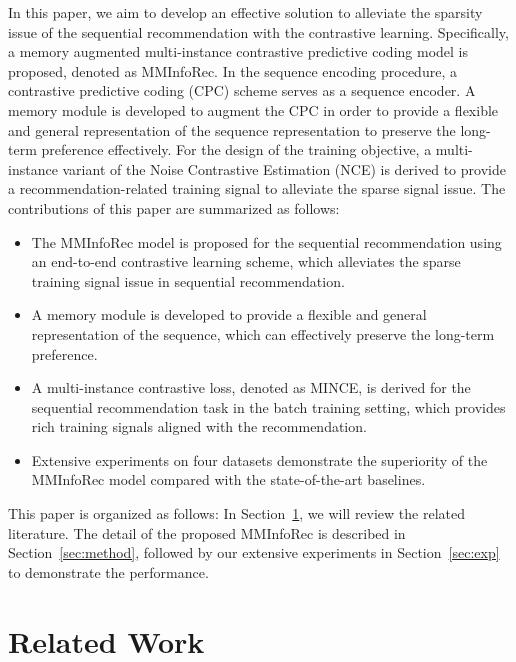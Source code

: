 \documentclass[conference]{IEEEtran}
\begin{document}
In this paper, we aim to develop an effective solution to alleviate the sparsity issue of the sequential recommendation with the contrastive learning. Specifically, a memory augmented multi-instance contrastive predictive coding model is proposed, denoted as MMInfoRec. In the sequence encoding procedure, a contrastive predictive coding (CPC) scheme serves as a sequence encoder. A memory module is developed to augment the CPC in order to provide a flexible and general representation of the sequence representation to preserve the long-term preference effectively. For the design of the training objective, a multi-instance variant of the Noise Contrastive Estimation (NCE) is derived to provide a recommendation-related training signal to alleviate the sparse signal issue. The contributions of this paper are summarized as follows:
\begin{itemize}
    \item The MMInfoRec model is proposed for the sequential recommendation using an end-to-end contrastive learning scheme, which alleviates the sparse training signal issue in sequential recommendation.
    \item A memory module is developed to provide a flexible and general representation of the sequence, which can effectively preserve the long-term preference.
    \item A multi-instance contrastive loss, denoted as MINCE, is derived for the sequential recommendation task in the batch training setting, which provides rich training signals aligned with the recommendation.
    \item Extensive experiments on four datasets demonstrate the superiority of the MMInfoRec model compared with the state-of-the-art baselines.
\end{itemize}

This paper is organized as follows: In Section~\ref{sec:rw}, we will review the related literature. 
The detail of the proposed MMInfoRec is described in Section~\ref{sec:method}, followed by our extensive experiments in Section~\ref{sec:exp} to demonstrate the performance.

\section{Related Work}
\label{sec:rw}
\end{document}
